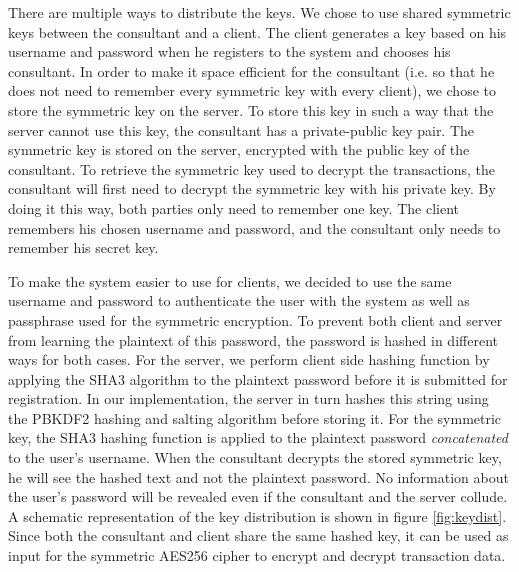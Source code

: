 \documentclass[a4paper]{article}
\begin{document}
There are multiple ways to distribute the keys. We chose to use shared symmetric keys between the consultant and a client. The client generates a key based on his username and password when he registers to the system and chooses his consultant. In order to make it space efficient for the consultant (i.e. so that he does not need to remember every symmetric key with every client), we chose to store the symmetric key on the server. To store this key in such a way that the server cannot use this key, the consultant has a private-public key pair. The symmetric key is stored on the server, encrypted with the public key of the consultant. To retrieve the symmetric key used to decrypt the transactions, the consultant will first need to decrypt the symmetric key with his private key.  By doing it this way, both parties only need to remember one key. The client remembers his chosen username and password, and the consultant only needs to remember his secret key. 

To make the system easier to use for clients, we decided to use the same username and password to authenticate the user with the system as well as passphrase used for the symmetric encryption. To prevent both client and server from learning the plaintext of this password, the password is hashed in different ways for both cases. For the server, we perform client side hashing function by applying the SHA3 algorithm to the plaintext password before it is submitted for registration. In our implementation, the server in turn hashes this string using the PBKDF2 hashing and salting algorithm before storing it. For the symmetric key, the SHA3 hashing function is applied to the plaintext password \emph{concatenated} to the user's username. When the consultant decrypts the stored symmetric key, he will see the hashed text and not the plaintext password. No information about the user's password will be revealed even if the consultant and the server collude. A schematic representation of the key distribution is shown in figure \ref{fig:keydist}. Since both the consultant and client share the same hashed key, it can be used as input for the symmetric AES256 cipher to encrypt and decrypt transaction data.
\end{document}
